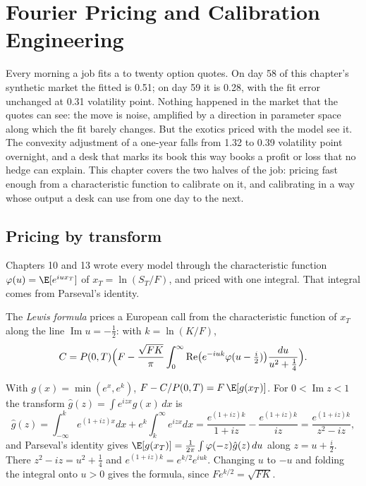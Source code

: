 \chapter{Fourier Pricing and Calibration Engineering}\label{ch:dv:fourier-pricing-and-calibration-engineering}

Every morning a job fits a  to twenty option quotes. On day 58 of this chapter's synthetic market the fitted  is 0.51; on day 59 it is 0.28, with the fit error unchanged at 0.31 volatility point. Nothing happened in the market that the
quotes can see: the move is noise, amplified by a direction in parameter space along which the fit barely changes. But the exotics priced
with the model see it. The convexity adjustment of a one-year  falls from 1.32 to 0.39 volatility point overnight, and a
desk that marks its book this way books a profit or loss that no hedge can explain. This chapter covers the two halves of the job: pricing
fast enough from a characteristic function to calibrate on it, and calibrating in a way whose output a desk can use from one day to the
next.

\section{Pricing by transform}

Chapters 10 and 13 wrote every model through the characteristic function $\varphi(u)=\E[e^{iux_T}]$ of $x_T=\ln(S_T/F)$, and priced with
one integral. That integral comes from Parseval's identity.

\begin{definition}\label{def:dv:fourier-pricing-and-calibration-engineering:lewis}
The \emph{Lewis formula} prices a European call from the characteristic function of $x_T$ along the line
$\operatorname{Im}u=-\frac12$: with $k=\ln(K/F)$,
\[
C=P(0,T)\Bigl(F-\frac{\sqrt{FK}}{\pi}\int_0^\infty\operatorname{Re}\bigl(e^{-iuk}\varphi(u-\tfrac i2)\bigr)\frac{du}{u^2+\frac14}\Bigr).
\]
\end{definition}

\begin{proposition}[Derivation]\label{prop:dv:fourier-pricing-and-calibration-engineering:lewis}
With $g(x)=\min(e^x,e^k)$, $F-C/P(0,T)=F\,\E[g(x_T)]$. For $0<\operatorname{Im}z<1$ the transform $\hat g(z)=\int e^{izx}g(x)\,dx$ is
\[
\hat g(z)=\int_{-\infty}^k e^{(1+iz)x}dx+e^k\int_k^\infty e^{izx}dx=\frac{e^{(1+iz)k}}{1+iz}-\frac{e^{(1+iz)k}}{iz}=\frac{e^{(1+iz)k}}{z^2-iz},
\]
and Parseval's identity gives $\E[g(x_T)]=\frac1{2\pi}\int\varphi(-z)\hat g(z)\,du$ along $z=u+\frac i2$. There $z^2-iz=u^2+\frac14$ and
$e^{(1+iz)k}=e^{k/2}e^{iuk}$. Changing $u$ to $-u$ and folding the integral onto $u>0$ gives the formula, since $Fe^{k/2}=\sqrt{FK}$.
\end{proposition}

